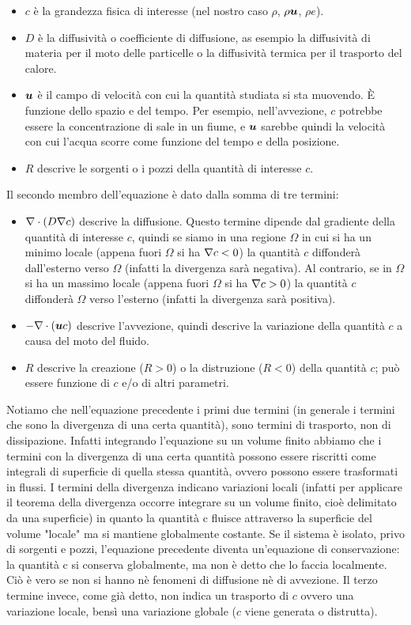 \begin{itemize}
\item $c$ è la grandezza fisica di interesse (nel nostro caso $\rho$, $\rho \V{u}$, $\rho e$). 
\item $D$ è la diffusività o coefficiente di diffusione, as esempio la diffusività di materia per il moto delle particelle o la diffusività termica per il trasporto del calore.
\item $\V{u}$ è il campo di velocità con cui la quantità studiata si sta muovendo. È funzione dello spazio e del tempo. Per esempio, nell'avvezione, $c$ potrebbe essere la concentrazione di sale in un fiume, e $\V{u}$ sarebbe quindi la velocità con cui l'acqua scorre come funzione del tempo e della posizione.
\item $R$ descrive le sorgenti o i pozzi della quantità di interesse $c$.
\end{itemize}
Il secondo membro dell'equazione è dato dalla somma di tre termini:
\begin{itemize}
\item $\V{\nabla}\cdot (D\V{\nabla}c)$ descrive la diffusione. Questo termine dipende dal gradiente della quantità di interesse $c$, quindi se siamo in una regione $\Omega$ in cui si ha un minimo locale (appena fuori $\Omega$ si ha $\V{\nabla}c < 0 $) la quantità $c$ diffonderà dall'esterno verso $\Omega$ (infatti la divergenza sarà negativa). Al contrario, se in $\Omega$ si ha un massimo locale (appena fuori $\Omega$ si ha $\V{\nabla}c > 0 $) la quantità $c$ diffonderà $\Omega$ verso l'esterno (infatti la divergenza sarà positiva).
\item $- \V{\nabla}\cdot (\V{u} c)$ descrive l'avvezione, quindi descrive la variazione della quantità $c$ a causa del moto del fluido.
\item $R$ descrive la creazione ($R>0$) o la distruzione ($R<0$) della quantità $c$; può essere funzione di $c$ e/o di altri parametri.
\end{itemize}
Notiamo che nell'equazione precedente i primi due termini (in generale i termini che sono la divergenza di una certa quantità), sono termini di trasporto, non di dissipazione. Infatti integrando l'equazione su un volume finito abbiamo che i termini con la divergenza di una certa quantità possono essere riscritti come integrali di superficie di quella stessa quantità, ovvero possono essere trasformati in flussi. I termini della divergenza indicano variazioni locali (infatti per applicare il teorema della divergenza occorre integrare su un volume finito, cioè delimitato da una superficie) in quanto la quantità c fluisce attraverso la superficie del volume "locale" ma si mantiene globalmente costante. Se il sistema è isolato, privo di sorgenti e pozzi, l'equazione precedente diventa un'equazione di conservazione: la quantità c si conserva globalmente, ma non è detto che lo faccia localmente. Ciò è vero se non si hanno nè fenomeni di diffusione nè di avvezione. Il terzo termine invece, come già detto, non indica un trasporto di $c$ ovvero una variazione locale, bensì una variazione globale ($c$ viene generata o distrutta).


